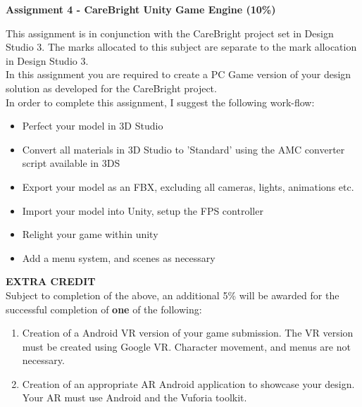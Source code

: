 
	
\begin{flushleft}
\Large\textbf{Assignment 4 - CareBright Unity Game Engine (10\%)}\\
\end{flushleft}

This assignment is in conjunction with the CareBright project set in Design Studio 3.  The marks allocated to this subject are separate to the mark allocation in Design Studio 3.\\

In this assignment you are required to create a PC Game version of your design solution as developed for the CareBright project.\\

In order to complete this assignment, I suggest the following work-flow:

\begin{itemize}
	\item Perfect your model in 3D Studio
	\item Convert all materials in 3D Studio to 'Standard' using the AMC converter script available in 3DS
	\item Export your model as an FBX, excluding all cameras, lights, animations etc.
	\item Import your model into Unity, setup the FPS controller
	\item Relight your game within unity
	\item Add a menu system, and scenes as necessary
\end{itemize}





\textbf{EXTRA CREDIT}\\
Subject to completion of the above, an additional 5\% will be awarded for the successful completion of \textbf{one} of the following:
\begin{enumerate}
	\item Creation of a Android VR version of your game submission.  The VR version must be created using Google VR.  Character movement, and menus are not necessary.
	\item Creation of an appropriate AR Android application to showcase your design.  Your AR must use Android and the Vuforia toolkit.
\end{enumerate}

